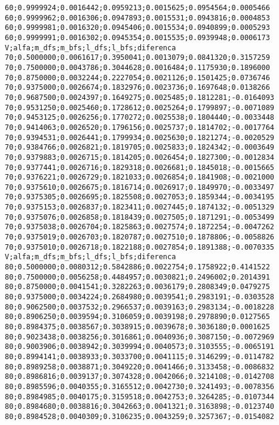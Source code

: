 \documentclass[brazil,times]{abnt}
\begin{document}
{\begin{verbatim}
60;0.9999924;0.0016442;0.0959213;0.0015625;0.0954564;0.0005466
60;0.9999962;0.0016306;0.0947893;0.0015531;0.0943816;0.0004853
60;0.9999981;0.0016320;0.0945406;0.0015534;0.0940899;0.0005293
60;0.9999991;0.0016302;0.0945354;0.0015535;0.0939948;0.0006173
V;alfa;m_dfs;m_bfs;l_dfs;l_bfs;diferenca
70;0.5000000;0.0061617;0.3950041;0.0013079;0.0841320;0.3157259
70;0.7500000;0.0043786;0.3044628;0.0016484;0.1175930;0.1896000
70;0.8750000;0.0032244;0.2227054;0.0021126;0.1501425;0.0736746
70;0.9375000;0.0026674;0.1832976;0.0023736;0.1697648;0.0138266
70;0.9687500;0.0024397;0.1649275;0.0025485;0.1812281;-0.0164093
70;0.9531250;0.0025460;0.1728612;0.0025264;0.1799897;-0.0071089
70;0.9453125;0.0026256;0.1770272;0.0025538;0.1804440;-0.0033448
70;0.9414063;0.0026520;0.1796156;0.0025737;0.1814702;-0.0017764
70;0.9394531;0.0026441;0.1799934;0.0025630;0.1821274;-0.0020529
70;0.9384766;0.0026821;0.1819705;0.0025833;0.1824342;-0.0003649
70;0.9379883;0.0026715;0.1814205;0.0026454;0.1827300;-0.0012834
70;0.9377441;0.0026716;0.1829318;0.0026681;0.1845018;-0.0015665
70;0.9376221;0.0026729;0.1821033;0.0026854;0.1841908;-0.0021000
70;0.9375610;0.0026675;0.1816714;0.0026917;0.1849970;-0.0033497
70;0.9375305;0.0026695;0.1825508;0.0027053;0.1859344;-0.0034195
70;0.9375153;0.0026837;0.1823411;0.0027445;0.1874132;-0.0051329
70;0.9375076;0.0026858;0.1818439;0.0027505;0.1871291;-0.0053499
70;0.9375038;0.0026704;0.1825863;0.0027574;0.1872254;-0.0047262
70;0.9375019;0.0026703;0.1820787;0.0027510;0.1878806;-0.0058826
70;0.9375010;0.0026718;0.1822188;0.0027854;0.1891388;-0.0070335
V;alfa;m_dfs;m_bfs;l_dfs;l_bfs;diferenca
80;0.5000000;0.0080312;0.5842886;0.0022754;0.1758922;0.4141522
80;0.7500000;0.0056258;0.4484957;0.0030821;0.2496002;0.2014391
80;0.8750000;0.0041541;0.3282263;0.0036179;0.2808349;0.0479275
80;0.9375000;0.0034224;0.2684980;0.0039541;0.2983191;-0.0303528
80;0.9062500;0.0037532;0.2966537;0.0039163;0.2983134;-0.0018228
80;0.8906250;0.0039594;0.3106059;0.0039198;0.2978890;0.0127565
80;0.8984375;0.0038567;0.3038915;0.0039678;0.3036180;0.0001625
80;0.9023438;0.0038256;0.3016861;0.0040936;0.3087150;-0.0072969
80;0.9003906;0.0038942;0.3039994;0.0040573;0.3103555;-0.0065191
80;0.8994141;0.0038933;0.3033700;0.0041115;0.3146299;-0.0114782
80;0.8989258;0.0038871;0.3049220;0.0041466;0.3133458;-0.0086832
80;0.8986816;0.0039137;0.3074328;0.0042066;0.3214108;-0.0142708
80;0.8985596;0.0040355;0.3165512;0.0042730;0.3241493;-0.0078356
80;0.8984985;0.0040175;0.3159518;0.0042753;0.3264285;-0.0107344
80;0.8984680;0.0038816;0.3042663;0.0041321;0.3163898;-0.0123740
80;0.8984528;0.0040309;0.3106235;0.0043259;0.3257367;-0.0154082

\end{verbatim}}
\end{document}
